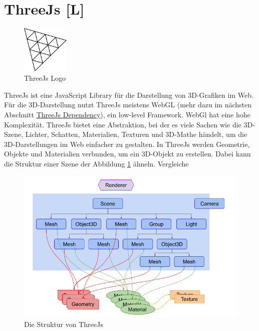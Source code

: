 \section{ThreeJs [L]}
\begin{figure}
    \begin{center}
      \includegraphics[width=0.2\textwidth]{pics/threeJS.png}
     \caption{ThreeJs Logo}
    \end{center}
\end{figure}
ThreeJs ist eine JavaScript Library für die Darstellung von 3D-Grafiken im Web. Für die 3D-Darstellung nutzt ThreeJs meistens WebGL (mehr dazu im nächsten Abschnitt \hyperref[ch::ThreeJsDependency]{ThreeJs Dependency}), ein low-level Framework. WebGl hat eine hohe Komplexität. ThreeJs bietet eine Abstraktion, bei der es viele Sachen wie die 3D-Szene, Lichter, Schatten, Materialien, Texturen und 3D-Mathe händelt, um die 3D-Darstellungen im Web einfacher zu gestalten. In ThreeJs werden Geometrie, Objekte und Materialien verbunden, um ein 3D-Objekt zu erstellen. Dabei kann die Struktur einer Szene der Abbildung \ref{fig:tech:front:threejsstructure} ähneln. Vergleiche \cite[ThreeJs fundamentals]{ThreeJsFund}

\begin{figure} [h t]
    \centering
    \includegraphics[scale=0.5]{pics/threejs-structure.png}
    \caption{Die Struktur von ThreeJs}
    \label{fig:tech:front:threejsstructure}
\end{figure}

